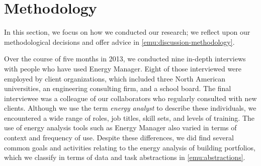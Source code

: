 

\section{Methodology}
\label{emu:methodology}


In this section, we focus on how we conducted our research; we reflect upon our methodological decisions and offer advice in \autoref{emu:discussion-methodology}. 

Over the course of five months in 2013, we conducted nine in-depth interviews with people who have used Energy Manager.
Eight of those interviewed were employed by client organizations, which included three North American universities, an engineering consulting firm, and a school board. 
The final interviewee was a colleague of our collaborators who regularly consulted with new clients.  
Although we use the term {\it energy analyst} to describe these individuals, we encountered a wide range of roles, job titles, skill sets, and levels of training. 
The use of energy analysis tools such as Energy Manager also varied in terms of context and frequency of use.
Despite these differences, we did find several common goals and activities relating to the energy analysis of building portfolios, which we classify in terms of data and task abstractions in \autoref{emu:abstractions}.

